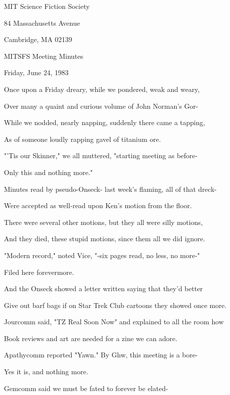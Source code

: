 \documentclass[12pt]{article}
\begin{document}
\begin{center}

MIT Science Fiction Society 

84 Massachusetts Avenue

Cambridge, MA 02139

\vspace{12pt}

MITSFS Meeting Minutes 

Friday, June 24, 1983

\end{center}
 
\vspace{18pt}

\setlength{\parskip}{6pt}

\noindent
Once upon a Friday dreary, while we pondered, weak and weary,

Over many a quaint and curious volume of John Norman's Gor-

While we nodded, nearly napping, suddenly there came a tapping,

As of someone loudly rapping gavel of titanium ore.

"'Tis our Skinner," we all muttered, "starting meeting as before-

Only this and nothing more."

Minutes read by pseudo-Onseck- last week's flaming, all of that dreck-

Were accepted as well-read upon Ken's motion from the floor.

There were several other motions, but they all were silly motions,

And they died, these stupid motions, since them all we did ignore.

"Modern record," noted Vice, "-six pages read, no less, no more-"

Filed here forevermore.

And the Onseck showed a letter written saying that they'd better

Give out barf bags if on Star Trek Club cartoons they showed once more.

Jourcomm said, "TZ Real Soon Now" and explained to all the room how

Book reviews and art are needed for a zine we can adore.

Apathycomm reported "Yawn." By Ghw, this meeting is a bore-

Yes it is, and nothing more.

Gemcomm said we must be fated to forever be elated-
\end{document}
